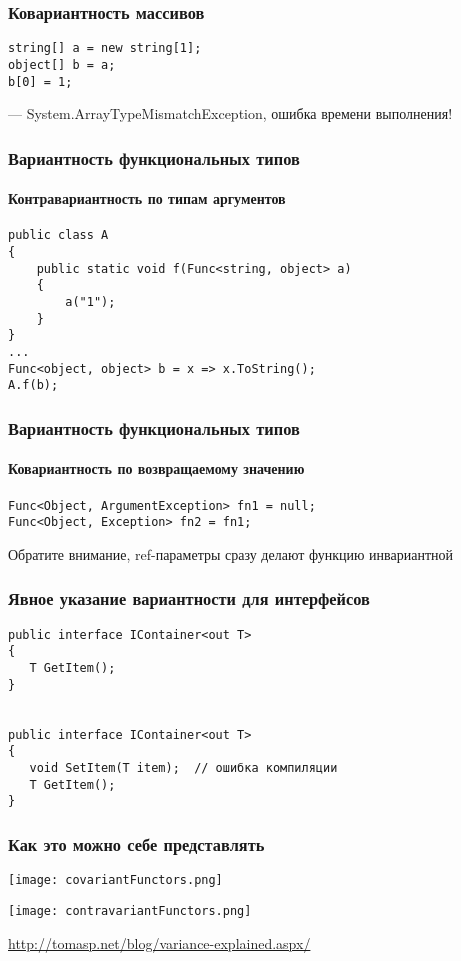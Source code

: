 \documentclass[xetex,mathserif,serif]{beamer}
\begin{document}
	\begin{frame}[fragile]
		\frametitle{Ковариантность массивов}
		\begin{verbatim}
string[] a = new string[1];
object[] b = a;
b[0] = 1;
		\end{verbatim}
		--- System.ArrayTypeMismatchException, ошибка времени выполнения!
	\end{frame}

	\begin{frame}[fragile]
		\frametitle{Вариантность функциональных типов}
		\framesubtitle{Контравариантность по типам аргументов}
		\begin{verbatim}
public class A
{
    public static void f(Func<string, object> a)
    {
        a("1");
    }
}
...
Func<object, object> b = x => x.ToString();
A.f(b);
		\end{verbatim}
	\end{frame}

	\begin{frame}[fragile]
		\frametitle{Вариантность функциональных типов}
		\framesubtitle{Ковариантность по возвращаемому значению}
		\begin{verbatim}
Func<Object, ArgumentException> fn1 = null;
Func<Object, Exception> fn2 = fn1;
		\end{verbatim}

		Обратите внимание, ref-параметры сразу делают функцию инвариантной
	\end{frame}

	\begin{frame}[fragile]
		\frametitle{Явное указание вариантности для интерфейсов}
		\begin{verbatim}
public interface IContainer<out T>
{
   T GetItem();
}


public interface IContainer<out T>
{
   void SetItem(T item);  // ошибка компиляции
   T GetItem();
}
		\end{verbatim}
	\end{frame}

	\begin{frame}
		\frametitle{Как это можно себе представлять}
		\begin{center}
			\texttt{[image: covariantFunctors.png]}

			\vspace{4mm}
			\texttt{[image: contravariantFunctors.png]}
		\end{center}
			
		\url{http://tomasp.net/blog/variance-explained.aspx/}
	\end{frame}
\end{document}
